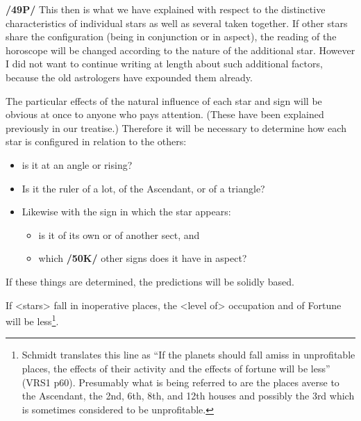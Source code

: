 \textbf{/49P/} This then is what we have explained with respect to the distinctive characteristics of individual stars as well as several taken together. If other stars share the configuration (being in conjunction or in aspect), the reading of the horoscope will be changed according to the nature of the additional star. However I did not want to continue writing at length about such additional factors, because the old astrologers have expounded them already. 

\mndl[0.2cm]
The particular effects of the natural influence of each star and sign will be obvious at once to anyone who pays attention. (These have been explained previously in our treatise.) Therefore it will be necessary to determine how each star is configured in relation to the others: 
\begin{itemize}
\item is it at an angle or rising? 
\item Is it the ruler of a lot, of the Ascendant, or of a triangle? 
\item Likewise with the sign in which the star appears: 
\begin{itemize}
\item is it of its own or of another sect, and 
\item which \textbf{/50K/} other signs does it have in aspect? 
\end{itemize}
\end{itemize}

If these things are determined, the predictions will be solidly based. 

If <stars> fall in inoperative places, the <level of> occupation and of Fortune will be less\footnote{Schmidt translates this line as ``If the planets should fall amiss in unprofitable places, the effects of their activity and the effects of fortune will be less'' (VRS1 p60). Presumably what is being referred to are the places averse to the Ascendant, the 2nd, 6th, 8th, and 12th houses and possibly the 3rd which is sometimes considered to be unprofitable.}.

\newpage